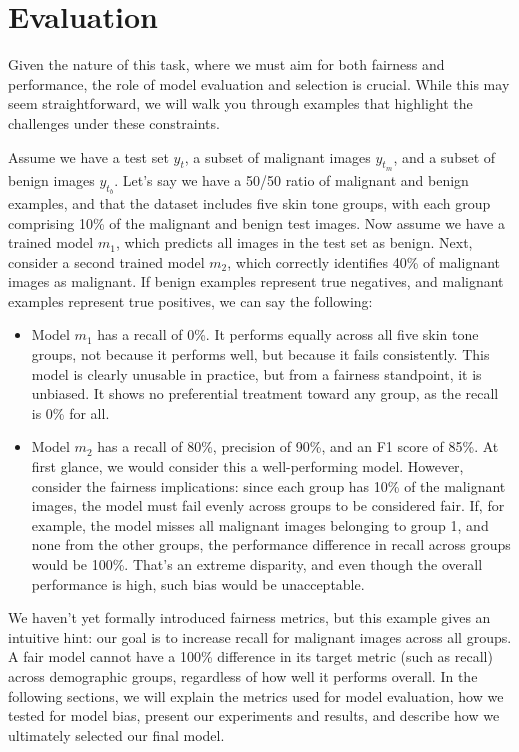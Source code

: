 \chapter{Evaluation}
\label{ch:evaluation}

Given the nature of this task, where we must aim for both fairness and performance, the role of model evaluation and selection is crucial. While this may seem straightforward, we will walk you through examples that highlight the challenges under these constraints.

Assume we have a test set \( y_t \), a subset of malignant images \( y_{t_m} \), and a subset of benign images \( y_{t_b} \). Let’s say we have a 50/50 ratio of malignant and benign examples, and that the dataset includes five skin tone groups, with each group comprising 10\% of the malignant and benign test images. Now assume we have a trained model \( m_1 \), which predicts all images in the test set as benign. Next, consider a second trained model \( m_2 \), which correctly identifies 40\% of malignant images as malignant. If benign examples represent true negatives, and malignant examples represent true positives, we can say the following:

\begin{itemize}

\item Model \( m_1 \) has a recall of 0\%. It performs equally across all five skin tone groups, not because it performs well, but because it fails consistently. This model is clearly unusable in practice, but from a fairness standpoint, it is unbiased. It shows no preferential treatment toward any group, as the recall is 0\% for all.

\item Model \( m_2 \) has a recall of 80\%, precision of 90\%, and an F1 score of 85\%. At first glance, we would consider this a well-performing model. However, consider the fairness implications: since each group has 10\% of the malignant images, the model must fail evenly across groups to be considered fair. If, for example, the model misses all malignant images belonging to group 1, and none from the other groups, the performance difference in recall across groups would be 100\%. That’s an extreme disparity, and even though the overall performance is high, such bias would be unacceptable.

\end{itemize}

We haven’t yet formally introduced fairness metrics, but this example gives an intuitive hint: our goal is to increase recall for malignant images across all groups. A fair model cannot have a 100\% difference in its target metric (such as recall) across demographic groups, regardless of how well it performs overall. In the following sections, we will explain the metrics used for model evaluation, how we tested for model bias, present our experiments and results, and describe how we ultimately selected our final model.

